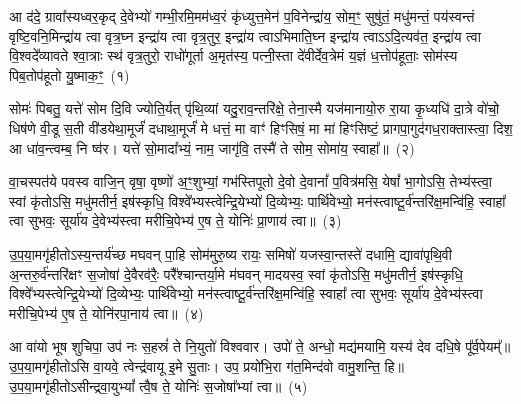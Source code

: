 \setcounter{anuvakam}{0}
आ द॑दे॒ ग्रावा᳚स्यध्वर॒कृद् दे॒वेभ्यो॑ गम्भी॒रमि॒मम॑ध्व॒रं कृ॑ध्युत्त॒मेन॑ प॒विनेन्द्रा॑य॒ सोम॒ꣳ॒ सुषु॑तं॒ मधु॑मन्तं॒ पय॑स्वन्तं वृष्टि॒वनि॒मिन्द्रा॑य त्वा वृत्र॒घ्न इन्द्रा॑य त्वा वृत्र॒तुर॒ इन्द्रा॑य त्वा\-ऽभिमाति॒घ्न इन्द्रा॑य त्वा\-ऽ\-ऽदि॒त्यव॑त॒ इन्द्रा॑य त्वा वि॒श्वदे᳚व्यावते श्वा॒त्राः स्थ॑ वृत्र॒तुरो॒ राधो॑गूर्ता अ॒मृत॑स्य॒ पत्नी॒स्ता दे॑वीर्देव॒त्रेमं य॒ज्ञं ध॒त्तोप॑हूताः॒ सोम॑स्य पिब॒तोप॑हूतो यु॒ष्माक॒ꣳ॒~(१)

सोमः॑ पिबतु॒ यत्ते॑ सोम दि॒वि ज्योति॒र्यत् पृ॑थि॒व्यां यदु॒राव॒न्तरि॑क्षे॒ तेना॒स्मै यज॑मानायो॒रु रा॒या कृ॒ध्यधि॑ दा॒त्रे वो॑चो॒ धिष॑णे वी॒डू स॒ती वी॑डयेथा॒मूर्जं॑ दधाथा॒मूर्जं॑ मे धत्तं॒ मा वाꣳ॑ हिꣳसिषं॒ मा मा॑ हिꣳसिष्टं॒ प्रागपा॒गुद॑गध॒राक्तास्त्वा॒ दिश॒ आ धा॑व॒न्त्वम्ब॒ नि ष्व॑र। यत्ते॑ सो॒मादा᳚भ्यं॒ नाम॒ जागृ॑वि॒ तस्मै॑ ते सोम॒ सोमा॑य॒ स्वाहा᳚॥~(२)

{\anuvakamend[{यु॒ष्माकꣴ॑ स्वर॒ यत्ते॒ नव॑ च}]}%

वा॒चस्पत॑ये पवस्व वाजि॒न् वृषा॒ वृष्णो॑ अ॒ꣳ॒शुभ्यां॒ गभ॑स्तिपूतो दे॒वो दे॒वानां᳚ प॒वित्र॑मसि॒ येषां᳚ भा॒गो\-ऽसि॒ तेभ्य॑स्त्वा॒ स्वां कृ॑तो\-ऽसि॒ मधु॑मतीर्न॒ इष॑स्कृधि॒ विश्वे᳚भ्यस्त्वेन्द्रि॒येभ्यो॑ दि॒व्येभ्यः॒ पार्थि॑वेभ्यो॒ मन॑स्त्वाष्टू॒र्व॑न्त\-रि॑क्ष॒मन्वि॑हि॒ स्वाहा᳚ त्वा सुभवः॒ सूर्या॑य दे॒वेभ्य॑स्त्वा मरीचि॒पेभ्य॑ ए॒ष ते॒ योनिः॑ प्रा॒णाय॑ त्वा॥~(३)

{\anuvakamend[{वा॒चः स॒प्तच॑त्वारिꣳशत्}]}%

उ॒प॒या॒मगृ॑हीतो\-ऽस्य॒न्तर्य॑च्छ मघवन् पा॒हि सोम॑मुरु॒ष्य रायः॒ समिषो॑ यजस्वा॒न्तस्ते॑ दधामि॒ द्यावा॑पृथि॒वी अ॒न्तरु॒र्व॑न्तरि॑क्षꣳ स॒जोषा॑ दे॒वैरव॑रैः॒ परै᳚श्चान्तर्या॒मे म॑घवन् मादयस्व॒ स्वां कृ॑तो\-ऽसि॒ मधु॑मतीर्न॒ इष॑स्कृधि॒ विश्वे᳚भ्यस्त्वेन्द्रि॒येभ्यो॑ दि॒व्येभ्यः॒ पार्थि॑वेभ्यो॒ मन॑स्त्वाष्टू॒र्व॑न्त\-रि॑क्ष॒मन्वि॑हि॒ स्वाहा᳚ त्वा सुभवः॒ सूर्या॑य दे॒वेभ्य॑स्त्वा मरीचि॒पेभ्य॑ ए॒ष ते॒ योनि॑रपा॒नाय॑ त्वा॥~(४)

{\anuvakamend[{दे॒वेभ्यः॑ स॒प्त च॑}]}%

आ वा॑यो भूष शुचिपा॒ उप॑ नः स॒हस्रं॑ ते नि॒युतो॑ विश्ववार। उपो॑ ते॒ अन्धो॒ मद्य॑मयामि॒ यस्य॑ देव दधि॒षे पू᳚र्व॒पेयम्᳚॥ उ॒प॒या॒मगृ॑हीतो\-ऽसि वा॒यवे॒ त्वेन्द्र॑वायू इ॒मे सु॒ताः। उप॒ प्रयो॑भि॒रा ग॑त॒मिन्द॑वो वामु॒शन्ति॒ हि॥ उ॒प॒या॒मगृ॑हीतो\-ऽसीन्द्रवा॒यु\-भ्यां᳚ त्वै॒ष ते॒ योनिः॑ स॒जोषा᳚भ्यां त्वा॥~(५)

{\anuvakamend[{आ वा॑यो॒ त्रिच॑त्वारिꣳशत्}]}%

